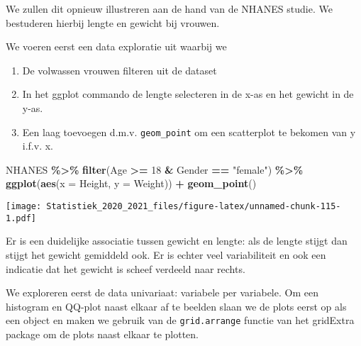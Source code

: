 \documentclass[
  12pt,dutch,coursenotes]{book}
\newenvironment{Shaded}{\begin{snugshade}}{\end{snugshade}}
\newcommand{\DataTypeTok}[1]{\textcolor[rgb]{0.13,0.29,0.53}{#1}}
\newcommand{\DecValTok}[1]{\textcolor[rgb]{0.00,0.00,0.81}{#1}}
\newcommand{\KeywordTok}[1]{\textcolor[rgb]{0.13,0.29,0.53}{\textbf{#1}}}
\newcommand{\NormalTok}[1]{#1}
\newcommand{\OperatorTok}[1]{\textcolor[rgb]{0.81,0.36,0.00}{\textbf{#1}}}
\newcommand{\StringTok}[1]{\textcolor[rgb]{0.31,0.60,0.02}{#1}}
\providecommand{\tightlist}{%
  \setlength{\itemsep}{0pt}\setlength{\parskip}{0pt}}
\theoremstyle{definition}
\theoremstyle{definition}
\theoremstyle{definition}
\theoremstyle{remark}
\begin{document}
We zullen dit opnieuw illustreren aan de hand van de NHANES studie. We bestuderen hierbij lengte en gewicht bij vrouwen.

We voeren eerst een data exploratie uit waarbij we

\begin{enumerate}
\def\labelenumi{\arabic{enumi}.}
\tightlist
\item
  De volwassen vrouwen filteren uit de dataset
\item
  In het ggplot commando de lengte selecteren in de x-as en het gewicht in de y-as.
\item
  Een laag toevoegen d.m.v. \texttt{geom\_point} om een scatterplot te bekomen van y i.f.v. x.
\end{enumerate}

\begin{Shaded}
\begin{Highlighting}[]
\NormalTok{NHANES }\OperatorTok{\%\textgreater{}\%}\StringTok{ }\KeywordTok{filter}\NormalTok{(Age }\OperatorTok{\textgreater{}=}\StringTok{ }\DecValTok{18} \OperatorTok{\&}\StringTok{ }\NormalTok{Gender }\OperatorTok{==}\StringTok{ "female"}\NormalTok{) }\OperatorTok{\%\textgreater{}\%}\StringTok{ }
\StringTok{    }\KeywordTok{ggplot}\NormalTok{(}\KeywordTok{aes}\NormalTok{(}\DataTypeTok{x =}\NormalTok{ Height, }\DataTypeTok{y =}\NormalTok{ Weight)) }\OperatorTok{+}\StringTok{ }\KeywordTok{geom\_point}\NormalTok{()}
\end{Highlighting}
\end{Shaded}

\texttt{[image: Statistiek\_2020\_2021\_files/figure-latex/unnamed-chunk-115-1.pdf]}

Er is een duidelijke associatie tussen gewicht en lengte: als de lengte stijgt dan stijgt het gewicht gemiddeld ook. Er is echter veel variabiliteit en ook een indicatie dat het gewicht is scheef verdeeld naar rechts.

We exploreren eerst de data univariaat: variabele per variabele. Om een histogram en QQ-plot naast elkaar af te beelden slaan we de plots eerst op als een object en maken we gebruik van de \texttt{grid.arrange} functie van het gridExtra package om de plots naast elkaar te plotten.
\end{document}
